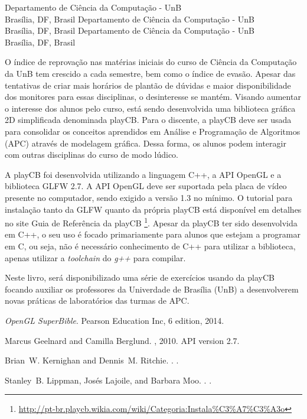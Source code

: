 \documentclass{wileySix}
\begin{document}
\begin{introduction}


{Departamento de Ciência da Computação - UnB\\
Brasília, DF, Brasil}
{Departamento de Ciência da Computação - UnB\\
Brasília, DF, Brasil}
{Departamento de Ciência da Computação - UnB\\
Brasília, DF, Brasil}

O índice de reprovação nas matérias iniciais do curso de Ciência da Computação da UnB tem crescido a cada semestre, bem como o índice de evasão. Apesar das tentativas de criar mais horários de plantão de dúvidas e maior disponibilidade dos monitores para essas disciplinas, o desinteresse se mantém. Visando aumentar o interesse dos alunos pelo curso, está sendo desenvolvida uma biblioteca gráfica 2D simplificada denominada playCB.
Para o discente, a playCB deve ser usada para consolidar os conceitos aprendidos em Análise e Programação de Algoritmos (APC) através de modelagem gráfica. Dessa forma, os alunos podem interagir com outras disciplinas do curso de modo lúdico. 

A playCB foi desenvolvida utilizando a linguagem C++, a API OpenGL e a biblioteca GLFW 2.7. A API OpenGL deve ser suportada pela placa de vídeo presente no computador, sendo exigido a versão 1.3 no mínimo. O tutorial para instalação tanto da GLFW quanto da própria playCB está disponível em detalhes no site Guia de Referência da playCB \footnote{\url{http://pt-br.playcb.wikia.com/wiki/Categoria:Instala\%C3\%A7\%C3\%A3o}}. Apesar da playCB ter sido desenvolvida em C++, o seu uso é focado primariamente para alunos que estejam a programar em C, ou seja, não é necessário conhecimento de C++ para utilizar a biblioteca, apenas utilizar a \emph{toolchain} do \emph{g++} para compilar.

Neste livro, será disponibilizado uma série de exercícios usando da playCB focando auxiliar os professores da Univerdade de Brasília (UnB) a desenvolverem novas práticas de laboratórios das turmas de APC.

\begin{chapreferences}{1}

{\em OpenGL SuperBible}.
\newblock Pearson Education Inc, 6 edition, 2014.

Marcus Geelnard and Camilla Berglund.
, 2010.
\newblock API version 2.7.

Brian~W. Kernighan and Dennis~M. Ritchie.
.
.

Stanley~B. Lippman, Josés Lajoile, and Barbara Moo.
.
.
\end{chapreferences}
\end{introduction}
\end{document}
